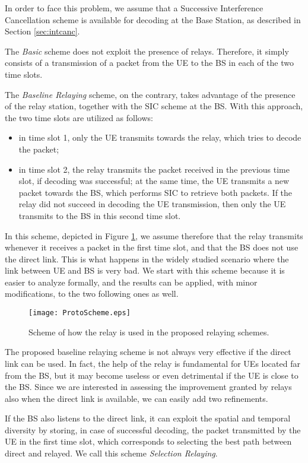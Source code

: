 \documentclass[12pt, letterpaper, onecolumn, draftcls]{IEEEtran}
\newcommand{\figw}{0.55\columnwidth}
\begin{document}
In order to face this problem, we assume that a Successive Interference Cancellation scheme is available for decoding at the Base Station, as described in Section \ref{sec:intcanc}.

The \textit{Basic} scheme does not exploit the presence of relays. Therefore, it simply consists of a transmission of a packet from the UE to the BS in each of the two time slots.

The \textit{Baseline Relaying} scheme, on the contrary, takes advantage of the presence of the relay station, together with the SIC scheme at the BS. With this approach, the two time slots are utilized as follows:
\begin{itemize}
 \item in time slot 1, only the UE transmits towards the relay, which tries to decode the packet;
 \item in time slot 2, the relay transmits the packet received in the previous time slot, if decoding was successful; at the same time, the UE transmits a new packet towards the BS, which performs SIC to retrieve both packets. If the relay did not succeed in decoding the UE transmission, then only the UE transmits to the BS in this second time slot.
\end{itemize}
In this scheme, depicted in Figure \ref{fig:ProtoScheme}, we assume therefore that the relay transmits whenever it receives a packet in the first time slot, and that the BS does not use the direct link. This is what happens in the widely studied scenario where the link between UE and BS is very bad.
We start with this scheme because it is easier to analyze formally, and the results can be applied, with minor modifications, to the two following ones as well.
\begin{figure}
    \centering
    \texttt{[image: ProtoScheme.eps]}
     \caption{\small Scheme of how the relay is used in the proposed relaying schemes.
}
     \vspace{-1cm}
  \label{fig:ProtoScheme}
\end{figure}

The proposed baseline relaying scheme is not always very effective if the direct link can be used. In fact, the help of the relay is fundamental for UEs located far from the BS, but it may become useless or even detrimental if the UE is close to the BS. Since we are interested in assessing the improvement granted by relays also when the direct link is available, we can easily add two refinements.

If the BS also listens to the direct link, it can exploit the spatial and temporal diversity by storing, in case of successful decoding, the packet transmitted by the UE in the first time slot, which corresponds to selecting the best path between direct and relayed. We call this scheme \textit{Selection Relaying}.
\end{document}
